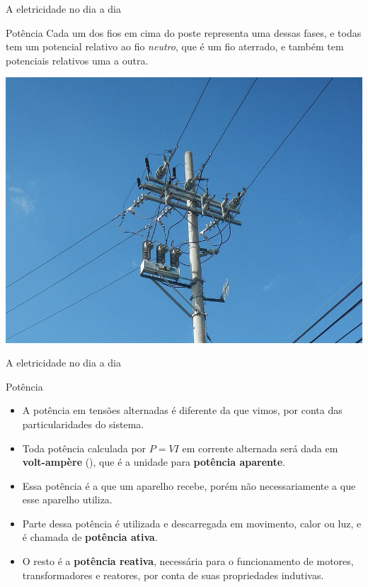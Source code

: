 \begin{frame}{A eletricidade no dia a dia}
	\begin{block}{Potência}
		Cada um dos fios em cima do poste representa uma dessas fases, e todas tem um potencial relativo ao fio \textit{neutro}, que é um fio aterrado, e também tem potenciais relativos uma a outra.
	\end{block}

	\centering
	\includegraphics[height=0.6\textheight]{Figuras/Ch01/fig7}

\end{frame}


\begin{frame}{A eletricidade no dia a dia}
	\begin{block}{Potência}
		\begin{itemize}
			\item A potência em tensões alternadas é diferente da que vimos, por conta das particularidades do sistema.
			\item Toda potência calculada por $ P=VI $ em corrente alternada será dada em \textbf{volt-ampère} (\si{\va}), que é a unidade para \textbf{potência aparente}.
			\item Essa potência é a que um aparelho recebe, porém não necessariamente a que esse aparelho utiliza.
			\item Parte dessa potência é utilizada e descarregada em movimento, calor ou luz, e é chamada de \textbf{potência ativa}.
			\item O resto é a \textbf{potência reativa}, necessária para o funcionamento de motores, transformadores e reatores, por conta de suas propriedades indutivas.
		\end{itemize}
	\end{block}
\end{frame}


